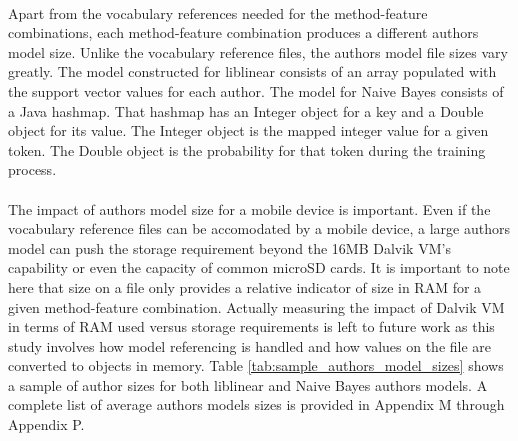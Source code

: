 	\paragraph*{} Apart from the vocabulary references needed for the method-feature combinations, each method-feature combination produces a different authors model size.  Unlike the vocabulary reference files, the authors model file sizes vary greatly.  The model constructed for liblinear consists of an array populated with the support vector values for each author.  The model for Naive Bayes consists of a Java hashmap.  That hashmap has an Integer object for a key and a Double object for its value.  The Integer object is the mapped integer value for a given token.  The Double object is the probability for that token during the training process.
	
	\paragraph*{} The impact of authors model size for a mobile device is important. Even if the vocabulary reference files can be accomodated by a mobile device, a large authors model can push the storage requirement beyond the 16MB Dalvik VM's capability or even the capacity of common microSD cards.  It is important to note here that size on a file only provides a relative indicator of size in RAM for a given method-feature combination.  Actually measuring the impact of Dalvik VM in terms of RAM used versus storage requirements is left to future work as this study involves how model referencing is handled and how values on the file are converted to objects in memory. Table \ref{tab:sample_authors_model_sizes} shows a sample of author sizes for both liblinear and Naive Bayes authors models.  A complete list of average authors models sizes is provided in Appendix M through Appendix P.
	

